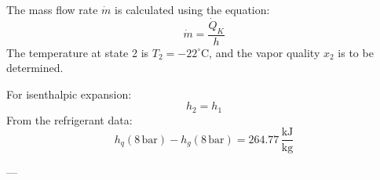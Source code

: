 The mass flow rate \( \dot{m} \) is calculated using the equation:  
\[
\dot{m} = \frac{\dot{Q}_K}{h}
\]  
The temperature at state 2 is \( T_2 = -22^\circ\text{C} \), and the vapor quality \( x_2 \) is to be determined.  

For isenthalpic expansion:  
\[
h_2 = h_1
\]  
From the refrigerant data:  
\[
h_q(8 \, \text{bar}) - h_g(8 \, \text{bar}) = 264.77 \, \frac{\text{kJ}}{\text{kg}}
\]  

---